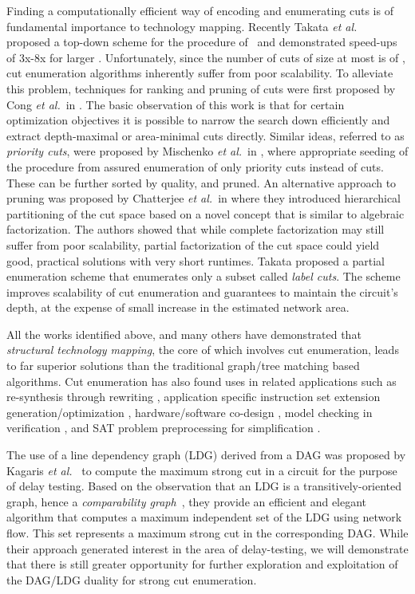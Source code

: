 \documentclass[journal]{IEEEtran}
\begin{document}
Finding a computationally efficient way of encoding and enumerating cuts is of fundamental importance to technology mapping. Recently Takata \emph{et al.\/}~\cite{takata2009efficient} proposed a top-down scheme for the procedure of~\cite{Pan1998} and demonstrated speed-ups of 3x-8x for larger . Unfortunately, since the number of cuts of size at most  is of , cut enumeration algorithms inherently suffer from poor scalability. To alleviate this problem, techniques for ranking and pruning of cuts were first proposed by Cong \emph{et al.}\ in \cite{Cong1999}. The basic observation of this work is that for certain optimization objectives it is possible to narrow the search down efficiently and extract depth-maximal or area-minimal cuts directly. Similar ideas, referred to as \emph{priority cuts}, were proposed by Mischenko \emph{et al.}\ in \cite{Mishchenko2007}, where appropriate seeding of the procedure from \cite{Pan1998} assured enumeration of only  priority cuts instead of  cuts.  These can be further  sorted by quality, and pruned. An alternative approach to pruning was proposed by Chatterjee \emph{et al.}\ in \cite{Chatterjee2006} where they introduced hierarchical partitioning of the cut space based on a novel concept that is similar to algebraic factorization. The authors showed that while complete factorization may still suffer from poor scalability, partial factorization of the cut space could yield good, practical solutions with very short runtimes.  Takata \cite{takata2009efficient} proposed a partial enumeration scheme that enumerates only a subset called \emph{label cuts}. The scheme improves scalability of cut enumeration and guarantees to maintain the circuit's depth, at the expense of small increase in the estimated network area. 

All the works identified above, and many others have demonstrated that \emph{structural technology mapping}, the core of which involves cut enumeration, leads to far superior solutions than the traditional graph/tree matching based algorithms. Cut enumeration has also found uses in related applications such as re-synthesis through rewriting \cite{Mishchenko2009}, application specific instruction set extension generation/optimization \cite{cong2006architecture}, hardware/software co-design \cite{peddersen2005rapid}, model checking in verification \cite{case2008cut}, and SAT problem preprocessing for simplification \cite{een2007applying}.

The use of a line dependency graph (LDG) derived from a DAG was proposed by Kagaris \emph{et al.}~\cite{kagaris1999maximum} to compute the maximum strong cut in a circuit for the purpose of delay testing. Based on the observation that an LDG is a transitively-oriented graph, hence a \emph{comparability graph}~\cite{golumbic2004algorithmic}, they provide an efficient and elegant algorithm that computes a maximum independent set of the LDG using network flow. This set represents a maximum strong cut in the corresponding DAG. While their approach generated interest in the area of delay-testing, we will demonstrate that there is still greater opportunity for further exploration and exploitation of the DAG/LDG duality for strong cut enumeration.
\end{document}
